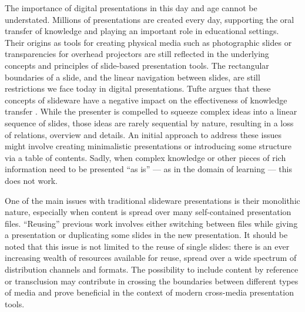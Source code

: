     The importance of digital presentations in this day and age cannot be
    understated. Millions of presentations are created every day, supporting
    the oral transfer of knowledge and playing an important role in educational
    settings. Their origins as tools for creating physical media such as
    photographic slides or transparencies for overhead projectors are still
    reflected in the underlying concepts and principles of slide-based
    presentation tools. The rectangular boundaries of a slide, and the linear
    navigation between slides, are still restrictions we face today in digital
    presentations. Tufte argues that these concepts of slideware have a
    negative impact on the effectiveness of knowledge transfer \citep{tufte-1}.
    While the presenter is compelled to squeeze complex ideas into a linear
    sequence of slides, those ideas are rarely sequential by nature, resulting
    in a loss of relations, overview and details. An initial approach to
    address these issues might involve creating minimalistic presentations or
    introducing some structure via a table of contents. Sadly, when complex
    knowledge or other pieces of rich information need to be presented “as is”
    \citep{farkas-1} --- as in the domain of learning --- this does not work.

    One of the main issues with traditional slideware presentations is their
    monolithic nature, especially when content is spread over many
    self-contained presentation files. ``Reusing'' previous work involves
    either switching between files while giving a presentation or duplicating
    some slides in the new presentation. It should be noted that this issue is
    not limited to the reuse of single slides: there is an ever increasing
    wealth of resources available for reuse, spread over a wide spectrum of
    distribution channels and formats. The possibility to include content by
    reference or transclusion \citep{nelson-1} may contribute in crossing the
    boundaries between different types of media and prove beneficial in the
    context of modern cross-media presentation tools.


